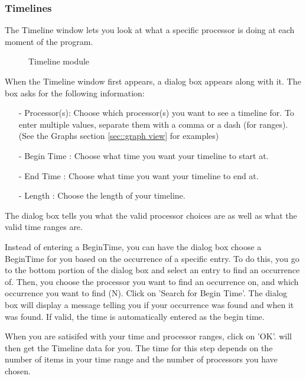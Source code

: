\documentclass[10pt,dvips]{article}
\begin{document}
\subsubsection{Timelines}
\label{sec::timeline view}
The Timeline window lets you look at what a specific processor is
doing at each moment of the program.

\begin{figure}[htb]
\center
{}
\caption{Timeline module}
\label{timeline}
\end{figure}

When the Timeline window first appears, a dialog box appears along
with it. The box asks for the following information:

\begin{itemize}
\item[-]
Processor(s): Choose which processor(s) you want to see a timeline
for. To enter multiple values, separate them with a comma or a dash
(for ranges). (See the Graphs section \ref{sec::graph view} for 
examples)
\item[-]
Begin Time  : Choose what time you want your timeline to start at.
\item[-]
End Time    : Choose what time you want your timeline to end at.
\item[-]
Length      : Choose the length of your timeline.
\end{itemize}

The dialog box tells you what the valid processor choices are as well as what
the valid time ranges are.

Instead of entering a BeginTime, you can have the dialog box choose a
BeginTime for you based on the occurrence of a specific entry.  To do
this, you go to the bottom portion of the dialog box and select an
entry to find an occurrence of.  Then, you choose the processor you
want to find an occurrence on, and which occurrence you want to find
(N). Click on 'Search for Begin Time'.  The dialog box will display a
message telling you if your occurrence was found and when it was
found. If valid, the time is automatically entered as the begin time.

When you are satisifed with your time and processor ranges, click on
'OK'.  \projections{} will then get the Timeline data for you.  The
time for this step depends on the number of items in your time range
and the number of processors you have chosen.
\end{document}

